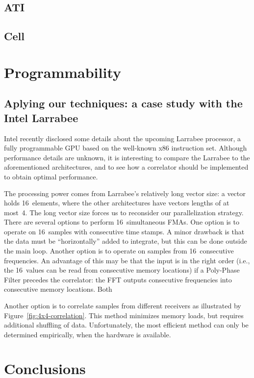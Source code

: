\documentclass{article}
\begin{document}
\subsection{ATI}
\subsection{Cell}


\section{Programmability}


\subsection{Aplying our techniques: a case study with the Intel Larrabee}

Intel recently disclosed some details about the upcoming Larrabee processor,
a fully programmable GPU based on the well-known x86 instruction set.
Although performance details are unknown, it is interesting to compare the
Larrabee to the aforementioned architectures, and to see how a correlator
should be implemented to obtain optimal performance.

The processing power comes from Larrabee's relatively long vector size:
a vector holds 16~elements, where the other architectures have vectors lengths
of at most~4.
The long vector size forces us to reconsider our parallelization strategy.
There are several options to perform 16~simultaneous FMAs.
One option is to operate on 16~samples with consecutive time stamps.
A minor drawback is that the data must be ``horizontally'' added to integrate,
but this can be done outside the main loop.
Another option is to operate on samples from 16~consecutive frequencies.
An advantage of this may be that the input is in the right order (i.e.,
the 16~values can be read from consecutive memory locations) if a Poly-Phase
Filter precedes the correlator: the FFT outputs consecutive frequencies into
consecutive memory locations.
Both 

Another option is to correlate samples from different receivers as illustrated
by Figure~\ref{fig:4x4-correlation}.
This method minimizes memory loads, but requires additional shuffling of data.
Unfortunately, the most efficient method can only be determined empirically,
when the hardware is available.

\section{Conclusions}




\end{document}
